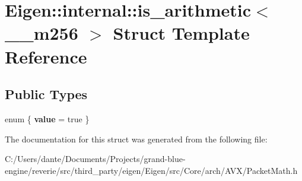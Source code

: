 \hypertarget{struct_eigen_1_1internal_1_1is__arithmetic_3_01____m256_01_4}{}\section{Eigen\+::internal\+::is\+\_\+arithmetic$<$ \+\_\+\+\_\+m256 $>$ Struct Template Reference}
\label{struct_eigen_1_1internal_1_1is__arithmetic_3_01____m256_01_4}
\subsection*{Public Types}
\begin{DoxyCompactItemize}
\item 
\mbox{\label{struct_eigen_1_1internal_1_1is__arithmetic_3_01____m256_01_4_a9caf5cf68da03fd7f41ed57cc03b3137}} 
enum \{ {\bfseries value} = true
 \}
\end{DoxyCompactItemize}


The documentation for this struct was generated from the following file\+:\begin{DoxyCompactItemize}
\item 
C\+:/\+Users/dante/\+Documents/\+Projects/grand-\/blue-\/engine/reverie/src/third\+\_\+party/eigen/\+Eigen/src/\+Core/arch/\+A\+V\+X/Packet\+Math.\+h\end{DoxyCompactItemize}
